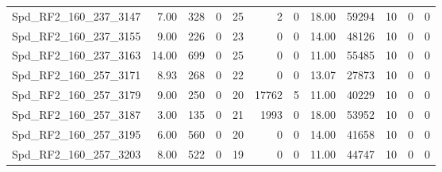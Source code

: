 \begin{longtable}[c]{@{}lrrrrrrrrrrr@{}}
Spd\_RF2\_160\_237\_3147     & 7.00                   & 328                     & 0                       & 25                     & 2                       & 0                       & 18.00                   & 59294                    & 10                       & 0                        & 0                        \\
Spd\_RF2\_160\_237\_3155     & 9.00                   & 226                     & 0                       & 23                     & 0                       & 0                       & 14.00                   & 48126                    & 10                       & 0                        & 0                        \\
Spd\_RF2\_160\_237\_3163     & 14.00                  & 699                     & 0                       & 25                     & 0                       & 0                       & 11.00                   & 55485                    & 10                       & 0                        & 0                        \\
Spd\_RF2\_160\_257\_3171     & 8.93                   & 268                     & 0                       & 22                     & 0                       & 0                       & 13.07                   & 27873                    & 10                       & 0                        & 0                        \\
Spd\_RF2\_160\_257\_3179     & 9.00                   & 250                     & 0                       & 20                     & 17762                   & 5                       & 11.00                   & 40229                    & 10                       & 0                        & 0                        \\
Spd\_RF2\_160\_257\_3187     & 3.00                   & 135                     & 0                       & 21                     & 1993                    & 0                       & 18.00                   & 53952                    & 10                       & 0                        & 0                        \\
Spd\_RF2\_160\_257\_3195     & 6.00                   & 560                     & 0                       & 20                     & 0                       & 0                       & 14.00                   & 41658                    & 10                       & 0                        & 0                        \\
Spd\_RF2\_160\_257\_3203     & 8.00                   & 522                     & 0                       & 19                     & 0                       & 0                       & 11.00                   & 44747                    & 10                       & 0                        & 0                        \\

\end{longtable}

